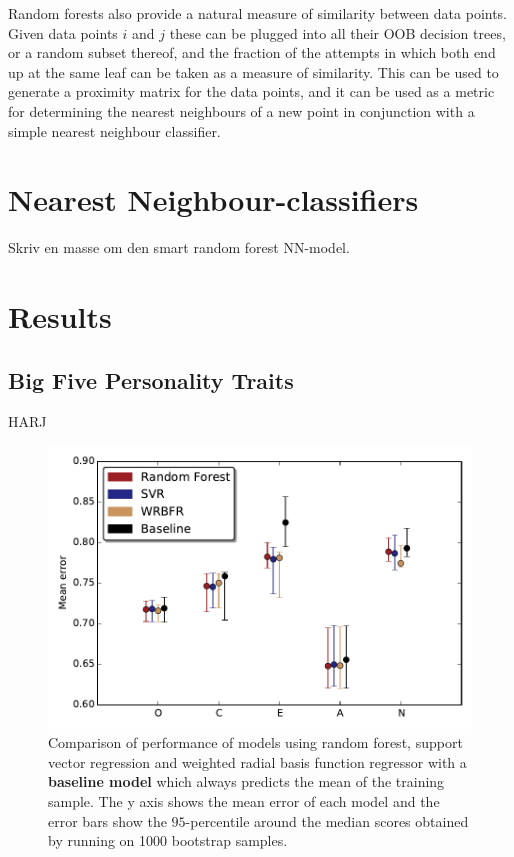 Random forests also provide a natural measure of similarity between data points. Given data points $i$ and $j$ these can be plugged into all their OOB decision trees, or a random subset thereof, and the fraction of the attempts in which both end up at the same leaf can be taken as a measure of similarity. This can be used to generate a proximity matrix for the data points, and it can be used as a metric for determining the nearest neighbours of a new point in conjunction with a simple nearest neighbour classifier.

\section{Nearest Neighbour-classifiers}
Skriv en masse om den smart random forest NN-model. 


\section{Results}

\subsection{Big Five Personality Traits}
\FloatBarrier
HARJ
\begin{figure}
	\includegraphics[width=\figwidth]{pics/ml/ml_cross_val_results.pdf}
	\caption{Comparison of performance of models using {\color{moerkeroed}random forest}, {\color{oldhat}support vector regression} and {\color{nude} weighted radial basis function regressor} with a {\color{black} \textbf{baseline model}} which always predicts the mean of the training sample. The y axis shows the mean error of each model and the error bars show the $95$-percentile around the median scores obtained by running on 1000 bootstrap samples.}
	\label{fig:cross_val_fail}
\end{figure}

